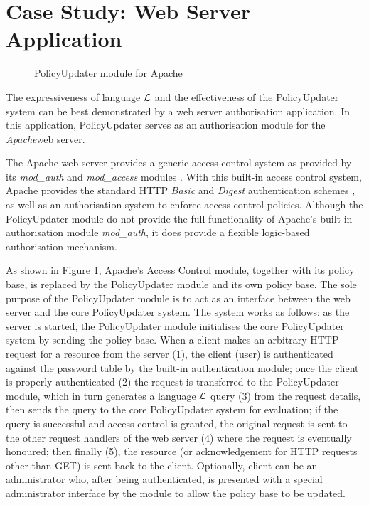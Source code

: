 \documentclass[11pt, twocolumn]{article}
\makeatletter
\newcommand{\vappsection}[1]{
  \renewcommand{\@seccntformat}[1]{
    \appendixname\hspace{0.5em}\csname the##1\endcsname \hspace{1em}
  }
  \section{#1}
  \renewcommand{\@seccntformat}[1]{
    \csname the##1\endcsname\hspace{1em}
  }
}
\makeatother
\begin{document}
  \newpage
  \appendix

  \vappsection{Case Study: Web Server Application}
    \label{app-case}

    \begin{figure}[ht]
      \begin{center}
        \caption{PolicyUpdater module for Apache}
        \label{fig-3}
      \end{center}
    \end{figure}

    The expressiveness of language $\cal{L}$ and the effectiveness of the
    PolicyUpdater system can be best demonstrated by a web server
    authorisation application. In this application, PolicyUpdater serves as
    an authorisation module for the {\em Apache}\footnotemark web server.


    The Apache web server provides a generic access control system as provided
    by its {\em mod\_auth} and {\em mod\_access} modules \cite{AP,LAU}. With
    this built-in access control system, Apache provides the standard HTTP
    {\em Basic} and {\em Digest} authentication schemes \cite{HTTP2}, as well
    as an authorisation system to enforce access control policies. Although the
    PolicyUpdater module do not provide the full functionality of Apache's
    built-in authorisation module {\em mod\_auth}, it does provide a flexible
    logic-based authorisation mechanism.

    As shown in Figure \ref{fig-3}, Apache's Access Control module, together
    with its policy base, is replaced by the PolicyUpdater module and its own
    policy base. The sole purpose of the PolicyUpdater module is to act as an
    interface between the web server and the core PolicyUpdater system. The
    system works as follows: as the server is started, the PolicyUpdater
    module initialises the core PolicyUpdater system by sending the policy
    base. When a client makes an arbitrary HTTP request for a resource from
    the server (1), the client (user) is authenticated against the password
    table by the built-in authentication module; once the client is properly
    authenticated (2) the request is transferred to the PolicyUpdater module,
    which in turn generates a language ${\cal L}$ query (3) from the request
    details, then sends the query to the core PolicyUpdater system for
    evaluation; if the query is successful and access control is granted,
    the original request is sent to the other request handlers of the web
    server (4) where the request is eventually honoured; then finally (5),
    the resource (or acknowledgement for HTTP requests other than GET) is sent
    back to the client. Optionally, client can be an administrator who,
    after being authenticated, is presented with a special administrator
    interface by the module to allow the policy base to be updated.
\end{document}
